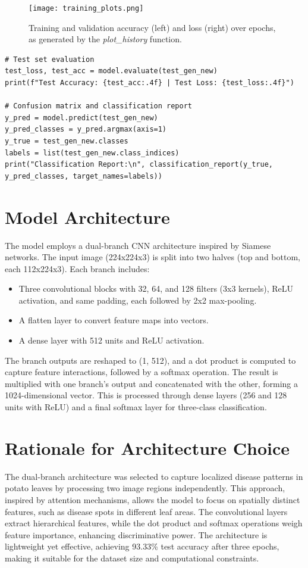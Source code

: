 \documentclass{article}
\begin{document}
\par

\begin{figure}[htbp]
    \centering
    \texttt{[image: training\_plots.png]}
    \caption{Training and validation accuracy (left) and loss (right) over epochs, as generated by the \textit{plot_history} function.}
    \label{fig:training_plots}
\end{figure}

\begin{lstlisting}
# Test set evaluation
test_loss, test_acc = model.evaluate(test_gen_new)
print(f"Test Accuracy: {test_acc:.4f} | Test Loss: {test_loss:.4f}")

# Confusion matrix and classification report
y_pred = model.predict(test_gen_new)
y_pred_classes = y_pred.argmax(axis=1)
y_true = test_gen_new.classes
labels = list(test_gen_new.class_indices)
print("Classification Report:\n", classification_report(y_true, y_pred_classes, target_names=labels))
\end{lstlisting}

\section{Model Architecture}
The model employs a dual-branch CNN architecture inspired by Siamese networks. The input image (224x224x3) is split into two halves (top and bottom, each 112x224x3). Each branch includes:
\begin{itemize}
    \item Three convolutional blocks with 32, 64, and 128 filters (3x3 kernels), ReLU activation, and same padding, each followed by 2x2 max-pooling.
    \item A flatten layer to convert feature maps into vectors.
    \item A dense layer with 512 units and ReLU activation.
\end{itemize}
The branch outputs are reshaped to (1, 512), and a dot product is computed to capture feature interactions, followed by a softmax operation. The result is multiplied with one branch's output and concatenated with the other, forming a 1024-dimensional vector. This is processed through dense layers (256 and 128 units with ReLU) and a final softmax layer for three-class classification.

\section{Rationale for Architecture Choice}
The dual-branch architecture was selected to capture localized disease patterns in potato leaves by processing two image regions independently. This approach, inspired by attention mechanisms, allows the model to focus on spatially distinct features, such as disease spots in different leaf areas. The convolutional layers extract hierarchical features, while the dot product and softmax operations weigh feature importance, enhancing discriminative power. The architecture is lightweight yet effective, achieving 93.33\% test accuracy after three epochs, making it suitable for the dataset size and computational constraints.
\end{document}
